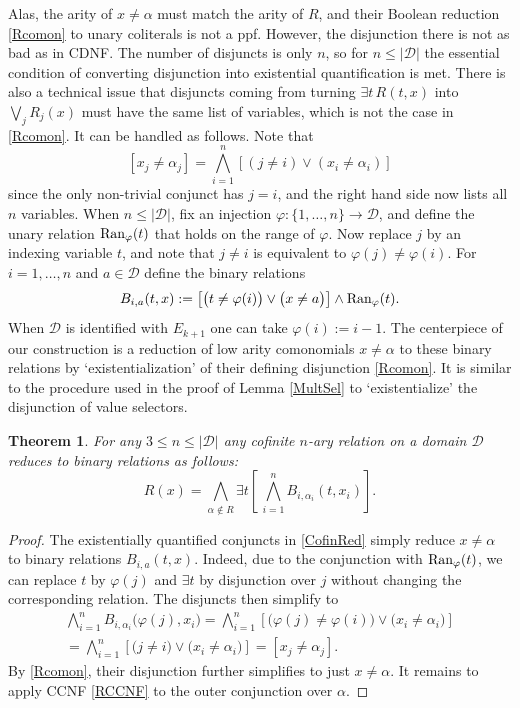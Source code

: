 \documentclass[11pt]{article}
\theoremstyle{plain}
\newtheorem{theorem}{Theorem}
\theoremstyle{definition}
\def\D{\mathcal{D}}
\def\a{\alpha}
\def\pfi{\varphi}
\begin{document}
Alas, the arity of $x\neq\a$ must match the arity of $R$, and their Boolean reduction \eqref{Rcomon} to unary coliterals is not a ppf. However, the disjunction there is not as bad as in CDNF. The number of disjuncts is only $n$, so for $n\leq|\D|$ the essential condition of converting disjunction into existential quantification is met. There is also a technical issue that disjuncts coming from turning $\exists t\,R(t,x)$ into $\bigvee_jR_j(x)$ must have the same list of variables, which is not the case in \eqref{Rcomon}. It can be handled as follows. Note that 
$$
[x_j\neq\a_j]=\bigwedge_{i=1}^n\left[(j\neq i)\lor(x_i\neq\a_i)\right]
$$
since the only non-trivial conjunct has $j=i$, and the right hand side now lists all $n$ variables. When $n\leq|\D|$, fix an injection $\pfi:\{1,\dots,n\}\to\D$, and define the unary relation $\textup{Ran}_\pfi(t)$ that holds on the range of $\pfi$. Now replace $j$ by an indexing variable $t$, and note that $j\neq i$ is equivalent to $\pfi(j)\neq\pfi(i)$. For $i=1,\dots,n$ and $a\in\D$ define the binary relations
$$
B_{i,a}(t,x):=\left[\big(t\neq\pfi(i)\big)\lor\big(x\neq a\big)\right]\land\textup{Ran}_\pfi(t).
$$
When $\D$ is identified with $E_{k+1}$ one can take $\pfi(i):=i-1$. The centerpiece of our construction is a reduction of low arity comonomials $x\neq\a$ to these binary relations by `existentialization' of their defining disjunction \eqref{Rcomon}. It is similar to the procedure used in the proof of Lemma \ref{MultSel} to `existentialize' the disjunction of value selectors.
\begin{theorem}\label{CoBin} For any $3\leq n\leq|\D|$ any cofinite $n$-ary relation on a domain $\D$ reduces to binary relations as follows:
\begin{equation}\label{CofinRed}
R(x)=\bigwedge_{\a\not\in R}\exists t\!\left[\,\bigwedge_{i=1}^nB_{i,\a_i}(t,x_i)\right]\!.
\end{equation}
\end{theorem}
\begin{proof} The existentially quantified conjuncts in \eqref{CofinRed} simply reduce $x\neq\a$ to binary relations $B_{i,a}(t,x)$. Indeed, due to the conjunction with $\textup{Ran}_\pfi(t)$, we can replace $t$ by $\pfi(j)$ and $\exists t$ by disjunction over $j$ without changing the corresponding relation. The disjuncts then simplify to
\vspace*{-0.9em}
\begin{multline*}
\bigwedge_{i=1}^nB_{i,\a_i}\big(\pfi(j),x_i\big)
=\bigwedge_{i=1}^n\left[\big(\pfi(j)\neq\pfi(i)\big)\lor\big(x_i\neq\a_i\big)\right]\\
=\bigwedge_{i=1}^n\left[\big(j\neq i\big)\lor\big(x_i\neq\a_i\big)\right]
=[x_j\neq\a_j]. 
\end{multline*}
By \eqref{Rcomon}, their disjunction further simplifies to just $x\neq\a$. It remains to apply CCNF \eqref{RCCNF} to the outer conjunction over $\a$.
\end{proof}
\end{document}
